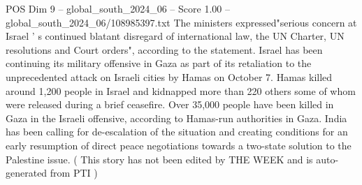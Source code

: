 \begin{textsample}{POS Dim 9 – global\_south\_2024\_06 – Score 1.00 – global\_south\_2024\_06/108985397.txt}
The ministers expressed"serious concern at Israel ' s continued blatant disregard of international law, the UN Charter, UN resolutions and Court orders", according to the statement.
Israel has been continuing its military offensive in Gaza as part of its retaliation to the unprecedented attack on Israeli cities by Hamas on October 7.
Hamas killed around 1,200 people in Israel and kidnapped more than 220 others some of whom were released during a brief ceasefire.
Over 35,000 people have been killed in Gaza in the Israeli offensive, according to Hamas-run authorities in Gaza.
India has been calling for de-escalation of the situation and creating conditions for an early resumption of direct peace negotiations towards a two-state solution to the Palestine issue. ( This story has not been edited by THE WEEK and is auto-generated from PTI )

\end{textsample}
